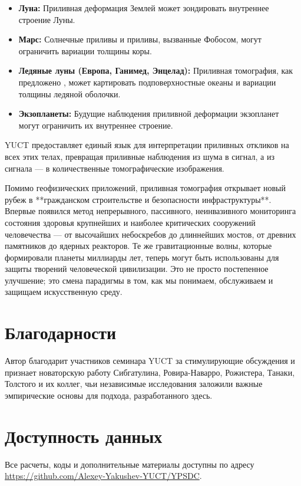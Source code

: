 \documentclass[12pt,a4paper]{article}
\theoremstyle{remark}
\begin{document}
	\begin{itemize}
		\item \textbf{Луна:} Приливная деформация Землей может зондировать внутреннее строение Луны.
		\item \textbf{Марс:} Солнечные приливы и приливы, вызванные Фобосом, могут ограничить вариации толщины коры.
		\item \textbf{Ледяные луны (Европа, Ганимед, Энцелад):} Приливная томография, как предложено \cite{RoviraNavarro2025}, может картировать подповерхностные океаны и вариации толщины ледяной оболочки.
		\item \textbf{Экзопланеты:} Будущие наблюдения приливной деформации экзопланет могут ограничить их внутреннее строение.
	\end{itemize}
	
	YUCT предоставляет единый язык для интерпретации приливных откликов на всех этих телах, превращая приливные наблюдения из шума в сигнал, а из сигнала — в количественные томографические изображения.
	
	Помимо геофизических приложений, приливная томография открывает новый рубеж в **гражданском строительстве и безопасности инфраструктуры**. Впервые появился метод непрерывного, пассивного, неинвазивного мониторинга состояния здоровья крупнейших и наиболее критических сооружений человечества — от высочайших небоскребов до длиннейших мостов, от древних памятников до ядерных реакторов. Те же гравитационные волны, которые формировали планеты миллиарды лет, теперь могут быть использованы для защиты творений человеческой цивилизации. Это не просто постепенное улучшение; это смена парадигмы в том, как мы понимаем, обслуживаем и защищаем искусственную среду.
	
	\section*{Благодарности}
	
	Автор благодарит участников семинара YUCT за стимулирующие обсуждения и признает новаторскую работу Сибгатулина, Ровира-Наварро, Рожистера, Танаки, Толстого и их коллег, чьи независимые исследования заложили важные эмпирические основы для подхода, разработанного здесь.
	
	\section*{Доступность данных}
	
	Все расчеты, коды и дополнительные материалы доступны по адресу \url{https://github.com/Alexey-Yakushev-YUCT/YPSDC}.
	
\end{document}
